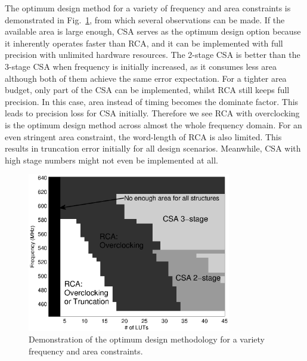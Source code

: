 \documentclass[journal]{IEEEtran}
\begin{document}
The optimum design method for a variety of frequency and area constraints is demonstrated in Fig.~\ref{Tradeoff}, from which several observations can be made. If the available area is large enough, CSA serves as the optimum design option because it inherently operates faster than RCA, and it can be implemented with full precision with unlimited hardware resources. The 2-stage CSA is better than the 3-stage CSA when frequency is initially increased, as it consumes less area although both of them achieve the same error expectation. For a tighter area budget, only part of the CSA can be implemented, whilst RCA still keeps full precision. In this case, area instead of timing becomes the dominate factor. This leads to precision loss for CSA initially. Therefore we see RCA with overclocking is the optimum design method across almost the whole frequency domain. For an even stringent area constraint, the word-length of RCA is also limited. This results in truncation error initially for all design scenarios. Meanwhile, CSA with high stage numbers might not even be implemented at all.
\begin{figure}[htbp]
  \centering
  \includegraphics[width=3.5in]{./Figures/Tradeoff.eps}
  \caption{Demonstration of the optimum design methodology for a variety frequency and area constraints.}
  \label{Tradeoff}
\end{figure}

\end{document}
